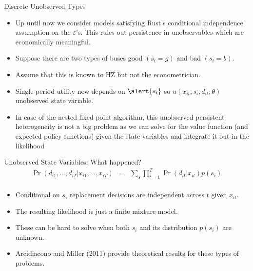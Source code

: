 \begin{frame}{Discrete Unobserved Types}
\begin{itemize}
\item Up until now we consider models satisfying Rust's \alert{conditional independence} assumption on the $\varepsilon$'s. This rules out persistence in unobservables which are economically meaningful.
\item Suppose there are two types of buses good $(s_i=g)$ and bad $(s_i=b)$.
\item Assume that this is known to HZ but not the econometrician.
\item Single period utility now depends on $\alert{s_i}$ so $u(x_{it},s_i,d_{it}; \theta)$ \alert{unobserved state variable}.
\item In case of the nested fixed point algorithm, this unobserved persistent heterogeneity is not a big problem as we can solve for the value function (and expected policy functions) given the state variables and \alert{integrate it out} in the likelihood
\end{itemize}
\end{frame}



\begin{frame}{Unobserved State Variables: What happened?}
\begin{eqnarray*}
\Pr(d_{i1},\ldots,d_{iT} | x_{i1},\ldots,x_{iT} ) &=& \sum_{s}  \prod_{t=1}^T \Pr(d_{it} | x_{it} )  p(s_i) \\
\end{eqnarray*}
\begin{itemize}
\item \alert{Conditional on $s_i$ replacement decisions are independent across $t$ given $x_{it}$}.
\item The resulting likelihood is just a \alert{finite mixture model}.
\item These can be hard to solve when both $s_i$ and its distribution $p(s_i)$ are unknown.
\item Arcidiacono and Miller (2011) provide theoretical results for these types of problems.
\end{itemize}
\end{frame}


